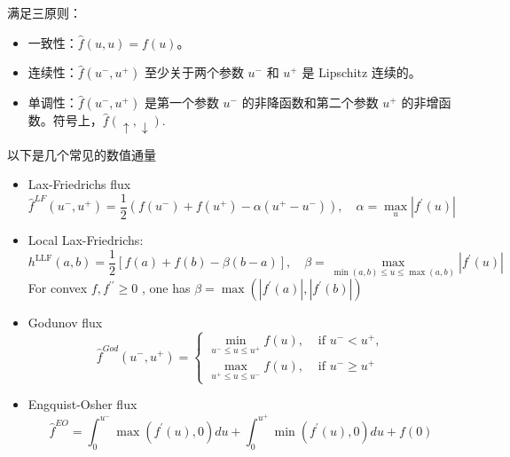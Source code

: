 \documentclass{article}
\numberwithin{equation}{subsection}    %
\begin{document}
满足三原则：
\begin{itemize}
    \item 一致性：$\widehat{f}(u, u)=f(u)$。
    \item 连续性：$\widehat{f}\left(u^{-}, u^{+}\right)$ 至少关于两个参数 $u^{-}$ 和 $u^{+}$ 是 Lipschitz 连续的。
    \item 单调性：$\widehat{f}\left(u^{-}, u^{+}\right)$ 是第一个参数 $u^{-}$ 的非降函数和第二个参数 $u^{+}$ 的非增函数。符号上，$\widehat{f}(\uparrow, \downarrow)$.
\end{itemize}
以下是几个常见的数值通量\cite{RN16}
\begin{itemize}
    \item Lax-Friedrichs flux
          \begin{equation}
              \widehat{f}^{L F}\left(u^{-}, u^{+}\right)=\frac{1}{2}\left(f\left(u^{-}\right)+f\left(u^{+}\right)-\alpha\left(u^{+}-u^{-}\right)\right), \quad \alpha=\max _{u}\left|f^{\prime}(u)\right|
          \end{equation}
    \item Local Lax-Friedrichs:
          \begin{equation}
              h^{\mathrm{LLF}}(a, b)=\frac{1}{2}[f(a)+f(b)-\beta(b-a)], \quad \beta=\max _{\min (a, b) \leq u \leq \max (a, b)}\left|f^{\prime}(u)\right|
          \end{equation}
          For convex  $f, f^{\prime \prime} \geq 0$ , one has  $\beta=\max \left(\left|f^{\prime}(a)\right|,\left|f^{\prime}(b)\right|\right) $
    \item Godunov flux
          \begin{equation}
              \widehat{f}^{G o d}\left(u^{-}, u^{+}\right)=\left\{\begin{array}{ll}
                  \min _{u^{-} \leq u \leq u^{+}} f(u), & \text { if } u^{-}<u^{+},     \\
                  \max _{u^{+} \leq u \leq u^{-}} f(u), & \text { if } u^{-} \geq u^{+}
              \end{array}\right.
          \end{equation}
    \item Engquist-Osher flux
          \begin{equation}
              \widehat{f}^{E O}=\int_{0}^{u^{-}} \max \left(f^{\prime}(u), 0\right) d u+\int_{0}^{u^{+}} \min \left(f^{\prime}(u), 0\right) d u+f(0)
          \end{equation}
\end{itemize}
\end{document}
